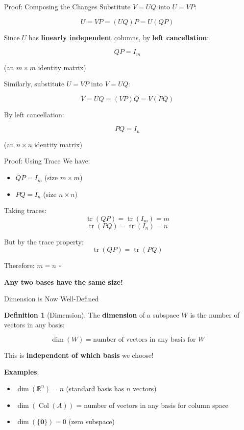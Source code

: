 \documentclass[10pt]{beamer}
\theoremstyle{definition}
\newtheorem{defi}{Definition}[section]
\newcommand{\x}[1]{\alert{\textbf{#1}}}
\begin{document}
\begin{frame}{Proof: Composing the Changes}
Substitute $V = UQ$ into $U = VP$:

$$U = VP = (UQ)P = U(QP)$$

\vfill
Since $U$ has \x{linearly independent} columns, by \x{left cancellation}:

$$QP = I_m$$

(an $m \times m$ identity matrix)

\vfill
Similarly, substitute $U = VP$ into $V = UQ$:

$$V = UQ = (VP)Q = V(PQ)$$

By left cancellation:

$$PQ = I_n$$

(an $n \times n$ identity matrix)
\end{frame}

\begin{frame}{Proof: Using Trace}
We have:
\begin{itemize}
\item $QP = I_m$ (size $m \times m$)
\item $PQ = I_n$ (size $n \times n$)
\end{itemize}

\vfill
Taking traces:
$$\operatorname{tr}(QP) = \operatorname{tr}(I_m) = m$$
$$\operatorname{tr}(PQ) = \operatorname{tr}(I_n) = n$$

\vfill
But by the trace property:
$$\operatorname{tr}(QP) = \operatorname{tr}(PQ)$$

\vfill
Therefore: $m = n$ $\square$

\vfill
\x{Any two bases have the same size!}
\end{frame}

\begin{frame}{Dimension is Now Well-Defined}
\begin{defi}[Dimension]
The \x{dimension} of a subspace $W$ is the number of vectors in any basis:

$$\dim(W) = \text{number of vectors in any basis for } W$$

This is \x{independent of which basis} we choose!
\end{defi}

\vfill
\x{Examples}:
\begin{itemize}
\item $\dim(\mathbb{R}^n) = n$ (standard basis has $n$ vectors)
\item $\dim(\operatorname{Col}(A))$ = number of vectors in any basis for column space
\item $\dim(\{\mathbf{0}\}) = 0$ (zero subspace)
\end{itemize}
\end{frame}
\end{document}
